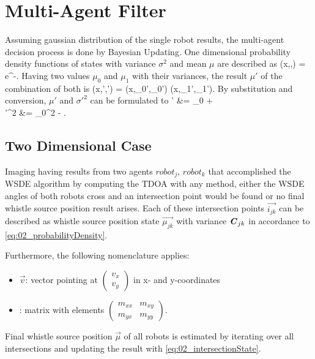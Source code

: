 \section{Multi-Agent Filter}
\label{sec:02_filter}

Assuming gaussian distribution of the single robot results,
the multi-agent decision process is done by Bayesian Updating.
One dimensional probability density functions of states with
variance $\sigma^2$ and mean $\mu$ are described as
\bal
    (x,\sigma,\mu) = e^{-}.
    \label{eq:02_probabilityDensity}
\eal
Having two values $\mu_0$ and $\mu_1$ with their variances,
the result $\mu'$ of the combination of both is
\bal
    (x,\sigma',\mu') = (x,\sigma_0',\mu_0') \cdot {}(x,\sigma_1',\mu_1').
    \label{eq:02_newProbabilityDensity}
\eal
By substitution and conversion, $\mu'$ and $\sigma'^2$ can be
formulated to
\bsub
\label{eq:02_intersectionState}
\bal
    \mu' &= \mu_0 + \\
    \sigma'^2 &= \sigma_0^2 - .
\eal
\esub

\subsection{Two Dimensional Case}
\label{subsec:02_2dTeam}

Imaging having results from two agents $robot_j$, $robot_k$ that accomplished the \ac{WSDE} algorithm by
computing the \ac{TDOA} with any method, either the \ac{WSDE} angles of both robots
cross and an intersection point would be found or no final whistle source position result arises.
Each of these intersection points $\vec{i_{jk}}$ can be described as whistle source position
state $\vec{\mu_{jk}}$ with variance $\textbf{\textit{C}}_{jk}$ in accordance to \cref{eq:02_probabilityDensity}.

Furthermore, the following nomenclature applies:
\begin{itemize}
\item $\vec{v}$: vector pointing at $\left( \begin{matrix} v_x \\ v_y \end{matrix} \right)$ in
      x- and y-coordinates
\item {}: matrix with elements $\left( \begin{matrix} m_{xx} & m_{xy} \\ m_{yx} & m_{yy} \end{matrix} \right)$.
\end{itemize}
Final whistle source position $\vec{\mu}$ of all robots is estimated by iterating over
all intersections and updating the result with \cref{eq:02_intersectionState}.

